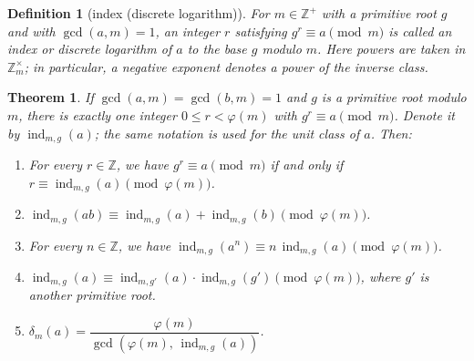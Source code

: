 \documentclass[11pt]{article}
\theoremstyle{ntstyle}
\newtheorem{theorem}{Theorem}[subsection]
\newtheorem{definition}{Definition}[subsection]
\newcommand{\ZmodUnits}[1]{\mathbb{Z}_{#1}^{\times}}
\DeclareMathOperator{\ind}{ind}
\begin{document}
\begin{definition}[index (discrete logarithm)]\label{def:6.3.1} For
	$m \in \mathbb{Z}^+$ with a primitive root $g$ and with $\gcd(a, m) =
		1$, an integer $r$ satisfying $g^{r} \equiv a \pmod{m}$ is called an
	index or discrete logarithm of $a$ to the base $g$ modulo $m$.
	Here powers are taken in $\ZmodUnits{m}$; in particular, a negative
	exponent denotes a power of the inverse class.
\end{definition}
\begin{theorem}\label{thm:6.3.1} If $\gcd(a, m) = \gcd(b, m) = 1$
	and $g$ is a primitive root modulo $m$, there is exactly one integer
	$0 \le r < \varphi(m)$ with $g^{r} \equiv a \pmod{m}$. Denote it by
	$\ind_{m,g}(a)$; the same notation is used for the unit class of $a$. Then:

	\begin{enumerate}[label={\alph*)}]
		\item For every $r\in\mathbb{Z}$, we have $g^{r} \equiv a \pmod{m}$ if and only if $r \equiv
						\ind_{m,g}(a) \pmod{\varphi(m)}$.
		\item $\ind_{m,g}(ab) \equiv
						\ind_{m,g}(a) + \ind_{m,g}(b) \pmod{\varphi(m)}$.
		\item For every $n\in\mathbb{Z}$, we have $\ind_{m,g}(a^{n}) \equiv n\,
						\ind_{m,g}(a) \pmod{\varphi(m)}$.
		\item $\ind_{m,g}(a) \equiv
						\ind_{m,g'}(a) \cdot \ind_{m,g}(g')
						\pmod{\varphi(m)}$, where $g'$ is another primitive root.
		\item $\delta_m(a) = \dfrac{\varphi(m)}{\gcd(\varphi(m), \, \ind_{m,g}(a))}$.
	\end{enumerate}
\end{theorem}
\end{document}
